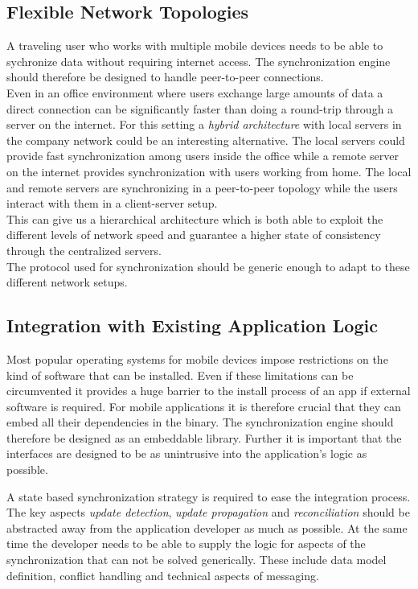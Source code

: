 \subsection{Flexible Network Topologies}
A traveling user who works with multiple mobile devices needs to be able to sychronize data without requiring internet access.
The synchronization engine should therefore be designed to handle peer-to-peer connections.\\
Even in an office environment where users exchange large amounts of data a direct connection can be significantly faster than doing a round-trip through a server on the internet.
For this setting a \emph{hybrid architecture} with local servers in the company network could be an interesting alternative.
The local servers could provide fast synchronization among users inside the office while a remote server on the internet provides synchronization with users working from home.
The local and remote servers are synchronizing in a peer-to-peer topology while the users interact with them in a client-server setup.\\
This can give us a hierarchical architecture which is both able to exploit the different levels of network speed and guarantee a higher state of consistency through the centralized servers.\\

The protocol used for synchronization should be generic enough to adapt to these different network setups.

\subsection{Integration with Existing Application Logic}
Most popular operating systems for mobile devices impose restrictions on the kind of software that can be installed.
Even if these limitations can be circumvented it provides a huge barrier to the install process of an app if external software is required.
For mobile applications it is therefore crucial that they can embed all their dependencies in the binary.
The synchronization engine should therefore be designed as an embeddable library.
Further it is important that the interfaces are designed to be as unintrusive into the application's logic as possible.

A state based synchronization strategy is required to ease the integration process. The key aspects \emph{update detection}, \emph{update propagation} and \emph{reconciliation} should be abstracted away from the application developer as much as possible.
At the same time the developer needs to be able to supply the logic for aspects of the synchronization that can not be solved generically. These include data model definition, conflict handling and technical aspects of messaging.

